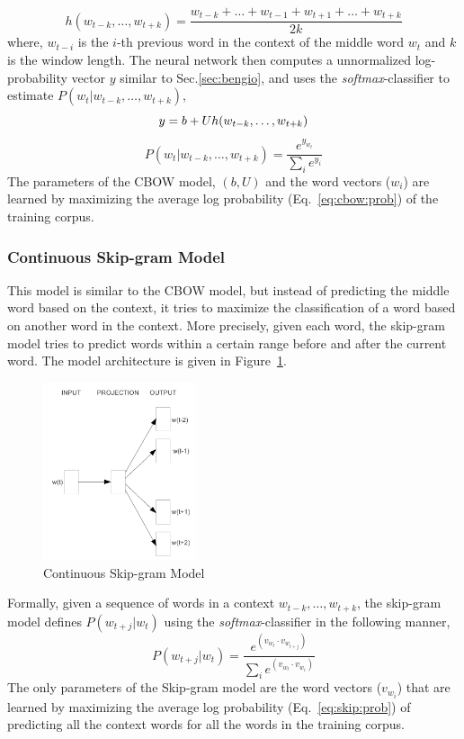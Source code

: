 \begin{equation}
h(w_{t-k}, \ldots, w_{t+k}) = \frac{w_{t-k} + \ldots + w_{t-1} + w_{t+1} + \dots + w_{t+k}}{2k}
\end{equation}
where, $w_{t-i}$ is the $i$-th previous word in the context of the middle word $w_{t}$ and $k$ is the window length.
The neural network then computes a unnormalized log-probability vector $y$ similar to Sec.\ref{sec:bengio}, and uses the \emph{softmax}-classifier to estimate $P(w_{t}|w_{t-k}, \ldots, w_{t+k})$,
\begin{equation}
y = b + Uh(w_{t-k}, \ldots, w_{t+k})\\
\end{equation}
\begin{equation}
\label{eq:cbow:prob}
P(w_{t}|w_{t-k}, \ldots, w_{t+k}) = \frac{e^{y_{w_t}}}{\sum_{i} e^{y_{i}}}
\end{equation}
The parameters of the CBOW model, $(b, U)$ and the word vectors ($w_{i}$) are learned by maximizing the average log probability (Eq.~\ref{eq:cbow:prob}) of the training corpus.

\subsubsection{Continuous Skip-gram Model}
This model is similar to the CBOW model, but instead of predicting the middle word based on the context, it tries to maximize the classification of a word based on another word in the context. More precisely, given each word, the skip-gram model tries to predict words within a certain range before and after the current word. The model architecture is given in Figure~\ref{fig:nn:skip}.
\begin{figure}[h!]
    \centering
        \includegraphics[width=0.4\textwidth]{figs/mikolov_skip.png}
    \caption{Continuous Skip-gram Model}
    \label{fig:nn:skip}
\end{figure}
Formally, given a sequence of words in a context $w_{t-k}, \ldots, w_{t+k}$, the skip-gram model defines $P(w_{t+j}|w_{t})$ using the \emph{softmax}-classifier in the following manner,
\begin{equation}
\label{eq:skip:prob}
P(w_{t+j}|w_{t}) = \frac{e^{(v_{w_{t}} \cdot v_{w_{t+j}} )} }{\sum_{i} e^{(v_{w_{t}} \cdot v_{w_{i}})} }
\end{equation}
The only parameters of the Skip-gram model are the word vectors ($v_{w_{i}}$) that are learned by maximizing the average log probability (Eq.~\ref{eq:skip:prob}) of predicting all the context words for all the words in the training corpus.

